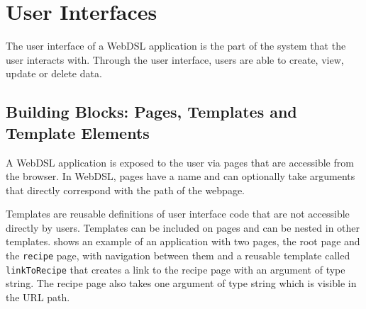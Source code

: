   \section{\label{sec:ui}User Interfaces}

    The user interface of a WebDSL application is the part of the system that the user interacts with. Through the user interface, users are able to create, view, update or delete data.

    \subsection{\label{subsec:building-blocks}Building Blocks: Pages, Templates and Template Elements}

      A WebDSL application is exposed to the user via pages that are accessible from the browser. In WebDSL, pages have a name and can optionally take arguments that directly correspond with the path of the webpage.

      Templates are reusable definitions of user interface code that are not accessible directly by users. Templates can be included on pages and can be nested in other templates.  shows an example of an application with two pages, the root page and the \texttt{recipe} page, with navigation between them and a reusable template called \texttt{linkToRecipe} that creates a link to the recipe page with an argument of type string. The recipe page also takes one argument of type string which is visible in the URL path.

